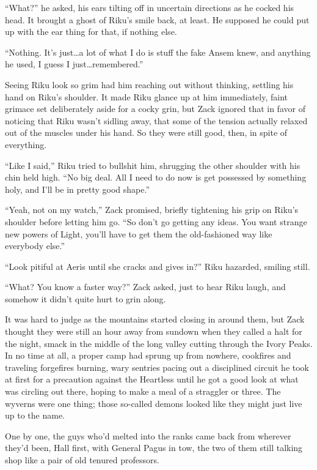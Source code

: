 ``What?'' he asked, his ears tilting off in uncertain directions as he cocked his head. It brought a ghost of Riku's smile back, at least. He supposed he could put up with the ear thing for that, if nothing else.

``Nothing. It's just\ldots a lot of what I do is stuff the fake Ansem knew, and anything he used, I guess I just\ldots remembered.''

Seeing Riku look so grim had him reaching out without thinking, settling his hand on Riku's shoulder. It made Riku glance up at him immediately, faint grimace set deliberately aside for a cocky grin, but Zack ignored that in favor of noticing that Riku wasn't sidling away, that some of the tension actually relaxed out of the muscles under his hand. So they were still good, then, in spite of everything.

``Like I said,'' Riku tried to bullshit him, shrugging the other shoulder with his chin held high. ``No big deal. All I need to do now is get possessed by something holy, and I'll be in pretty good shape.''

``Yeah, not on my watch,'' Zack promised, briefly tightening his grip on Riku's shoulder before letting him go. ``So don't go getting any ideas. You want strange new powers of Light, you'll have to get them the old-fashioned way like everybody else.''

``Look pitiful at Aeris until she cracks and gives in?'' Riku hazarded, smiling still.

``What? You know a faster way?'' Zack asked, just to hear Riku laugh, and somehow it didn't quite hurt to grin along.

It was hard to judge as the mountains started closing in around them, but Zack thought they were still an hour away from sundown when they called a halt for the night, smack in the middle of the long valley cutting through the Ivory Peaks. In no time at all, a proper camp had sprung up from nowhere, cookfires and traveling forgefires burning, wary sentries pacing out a disciplined circuit he took at first for a precaution against the Heartless until he got a good look at what was circling out there, hoping to make a meal of a straggler or three. The wyverns were one thing; those so-called demons looked like they might just live up to the name.

One by one, the guys who'd melted into the ranks came back from wherever they'd been, Hall first, with General Pagus in tow, the two of them still talking shop like a pair of old tenured professors.


